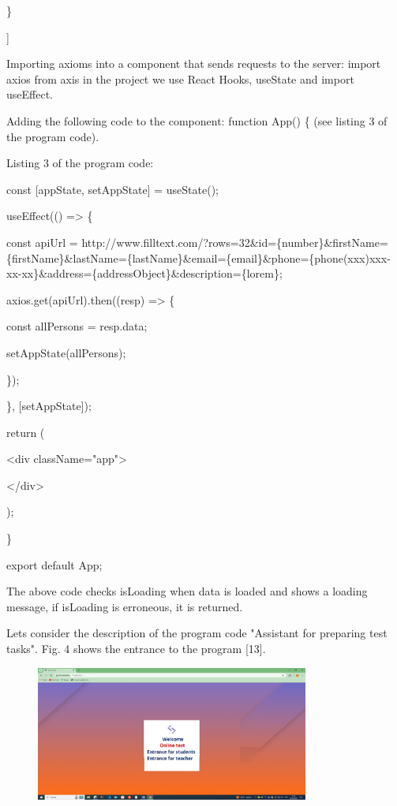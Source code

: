 \}

{]}

Importing axioms into a component that sends requests to the server:
import axios from \textquotesingle axis\textquotesingle{} in the project
we use React Hooks, useState and import useEffect.

Adding the following code to the component: function App() \{ (see
listing 3 of the program code).

Listing 3 of the program code:

const {[}appState, setAppState{]} = useState();

useEffect(() =\textgreater{} \{

const apiUrl =
\textquotesingle http://www.filltext.com/?rows=32\&id=\{number\}\&firstName=\{firstName\}\&lastName=\{lastName\}\&email=\{email\}\&phone=\{phone\textbar(xxx)xxx-xx-xx\}\&address=\{addressObject\}\&description=\{lorem\}\textquotesingle;

axios.get(apiUrl).then((resp) =\textgreater{} \{

const allPersons = resp.data;

setAppState(allPersons);

\});

\}, {[}setAppState{]});

return (

\textless div className="app"\textgreater{}

\textless/div\textgreater{}

);

\}

export default App;

The above code checks isLoading when data is loaded and shows a loading
message, if isLoading is erroneous, it is returned.

Let\textquotesingle s consider the description of the program code
"Assistant for preparing test tasks". Fig. 4 shows the entrance to the
program {[}13{]}.

\begin{figure}[H]
	\centering
	\includegraphics[width=0.8\textwidth]{assets/129}
	\caption*{}
\end{figure}

